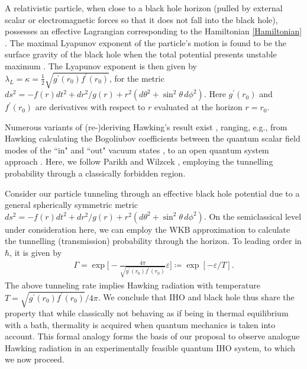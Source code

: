 \documentclass[prl,twocolumn,superscriptaddress,floatfix,showpacs,amsmath,longbibliography,nofootinbib,amssymb]{revtex4-1}
\newcommand{\colb}[1]{\textcolor{blue}{#1}}
\begin{document}
A relativistic particle, when close to a black hole horizon (pulled by external  
scalar or electromagnetic forces so that it does not fall into the black hole),  
possesses an effective Lagrangian corresponding to the 
Hamiltonian \eqref{Hamiltonian} \cite{PhysRevD.95.024007}. 
The maximal Lyapunov exponent of the particle's motion is  
found to be the surface gravity of the black hole when the total potential presents unstable maximum \cite{PhysRevD.95.024007}. The Lyapunov exponent is then given by 
$\lambda_L=\kappa=\frac{1}{2}\sqrt{g^\prime(r_0)f^\prime(r_0)}$, for the metric $ds^2=-f(r)dt^2+dr^2/g(r)+r^2(d\theta^2+\sin^2\theta\,d\phi^2)$. Here $g^\prime(r_0)$ and $f^\prime(r_0)$ are derivatives with respect to $r$ evaluated at the horizon $r=r_0$. 

Numerous variants of (re-)deriving Hawking's result exist  
\cite{Hawking1, Hawking1975, Gibbons, Parikh, Robinson, Satoshi, Peet:2000hn, STROMINGER199699, PhysRevD.77.024031}, ranging, e.g., from Hawking calculating the Bogoliubov coefficients between the quantum scalar field modes of the ``in" and ``out" vacuum states \cite{Hawking1, Hawking1975}, to an open quantum system approach \cite{PhysRevD.77.024031}. Here, we 
follow Parikh and Wilzcek \cite{Parikh}, employing the tunnelling probability through a classically forbidden region.

Consider our particle tunneling through an effective black hole potential due to a general spherically symmetric  metric $ds^2=-f(r)dt^2+dr^2/g(r)+r^2(d\theta^2+\sin^2\theta\,d\phi^2)$. 
On the semiclassical level under consideration here, we can employ the 
WKB approximation to calculate the tunnelling (transmission) probability through the horizon. 
To leading order in $\hbar$, it is given by \cite{Kerner2008}
\begin{eqnarray}
\Gamma=\exp\bigg[-\frac{4\pi}{\sqrt{g^\prime(r_0)f^\prime(r_0)}}\varepsilon\bigg]\coloneqq\exp[-\varepsilon/T]. 
\end{eqnarray}
The above tunneling rate implies Hawking radiation with 
temperature $T=\sqrt{g^\prime(r_0)f^\prime(r_0)}/4\pi$.
We conclude that IHO and black hole thus share the 
property that while classically not behaving as if being in thermal equilibrium with a bath, thermality is acquired when 
quantum mechanics is taken into account.  
This formal analogy forms the basis of our proposal to observe analogue 
Hawking radiation in an experimentally feasible  quantum IHO system, to which we now proceed.
\end{document}
